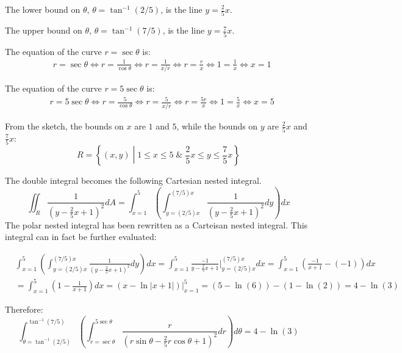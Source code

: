 \documentclass{article}
\begin{document}
The lower bound on \(\theta\), \(\theta = \tan^{-1}(2/5)\), is the line \(y = \frac{2}{5}x\). 

The upper bound on \(\theta\), \(\theta = \tan^{-1}(7/5)\), is the line \(y = \frac{7}{5}x\). 

The equation of the curve \(r = \sec\theta\) is: 
\begin{align*}
& r = \sec\theta 
\iff r = \frac{1}{\cos\theta}    
\iff r = \frac{1}{x/r} 
\iff r = \frac{r}{x} 
\iff 1 = \frac{1}{x} 
\iff x = 1
\end{align*}

The equation of the curve \(r = 5\sec\theta\) is: 
\begin{align*}
& r = 5\sec\theta 
\iff r = \frac{5}{\cos\theta}    
\iff r = \frac{5}{x/r} 
\iff r = \frac{5r}{x} 
\iff 1 = \frac{5}{x} 
\iff x = 5
\end{align*}

From the sketch, the bounds on \(x\) are \(1\) and \(5\), while the bounds on \(y\) are \(\frac{2}{5}x\) and \(\frac{7}{5}x\):
\[R = \left\{(x, y)\middle| 1 \leq x \leq 5 \;\&\; \frac{2}{5}x \leq y \leq \frac{7}{5}x\right\}\]

The double integral becomes the following Cartesian nested integral. 
\[\iint_R \frac{1}{(y - \frac{2}{5}x + 1)^2} dA = \int_{x = 1}^{5} \left(\int_{y = (2/5)x}^{(7/5)x} \frac{1}{(y - \frac{2}{5}x + 1)^2} dy\right)dx\]
The polar nested integral has been rewritten as a Carteisan nested integral. This integral can in fact be further evaluated:

\begin{align*}
& \int_{x = 1}^{5} \left(\int_{y = (2/5)x}^{(7/5)x} \frac{1}{(y - \frac{2}{5}x + 1)^2} dy\right)dx 
= \int_{x = 1}^{5} \frac{-1}{y - \frac{2}{5}x + 1}\Big|_{y = (2/5)x}^{(7/5)x} dx   
= \int_{x = 1}^{5} \left(\frac{-1}{x + 1} - (-1)\right) dx \\  
& = \int_{x = 1}^{5} \left(1 - \frac{1}{x + 1}\right) dx 
= (x - \ln|x + 1|)\Big|_{x = 1}^{5} 
= (5 - \ln(6)) - (1 - \ln(2)) 
= 4 - \ln(3)
\end{align*}

Therefore:
\[\int_{\theta = \tan^{-1}(2/5)}^{\tan^{-1}(7/5)} \left(\int_{r = \sec\theta}^{5\sec\theta} \frac{r}{(r\sin\theta - \frac{2}{5}r\cos\theta + 1)^2} dr\right)d\theta = 4 - \ln(3)\]
\end{document}
